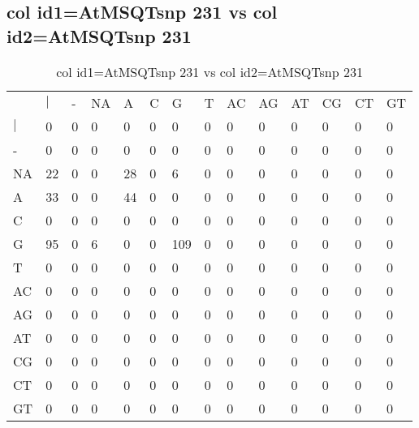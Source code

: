 \subsection{col id1=AtMSQTsnp 231 vs col id2=AtMSQTsnp 231}
\begin{center}
\begin{longtable}{|l|l|l|l|l|l|l|l|l|l|l|l|l|l|}
\caption{col id1=AtMSQTsnp 231 vs col id2=AtMSQTsnp 231} \label{table_dm790}\\
\hline
\\
\hline
&$|$&-&NA&A&C&G&T&AC&AG&AT&CG&CT&GT\\
$|$&0&0&0&0&0&0&0&0&0&0&0&0&0\\
-&0&0&0&0&0&0&0&0&0&0&0&0&0\\
NA&22&0&0&28&0&6&0&0&0&0&0&0&0\\
A&33&0&0&44&0&0&0&0&0&0&0&0&0\\
C&0&0&0&0&0&0&0&0&0&0&0&0&0\\
G&95&0&6&0&0&109&0&0&0&0&0&0&0\\
T&0&0&0&0&0&0&0&0&0&0&0&0&0\\
AC&0&0&0&0&0&0&0&0&0&0&0&0&0\\
AG&0&0&0&0&0&0&0&0&0&0&0&0&0\\
AT&0&0&0&0&0&0&0&0&0&0&0&0&0\\
CG&0&0&0&0&0&0&0&0&0&0&0&0&0\\
CT&0&0&0&0&0&0&0&0&0&0&0&0&0\\
GT&0&0&0&0&0&0&0&0&0&0&0&0&0\\
\hline
\end{longtable}
\end{center}

